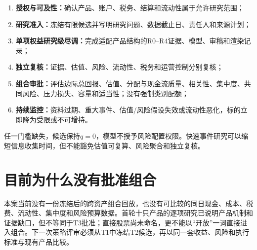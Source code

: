 \begin{enumerate}
  \item \textbf{授权与可及性：}确认产品、账户、税务、结算和流动性属于允许研究范围；
  \item \textbf{研究准入：}冻结有限候选并写明研究问题、数据截止日、责任人和来源计划；
  \item \textbf{单项权益研究级尽调：}完成适配产品结构的R0--R4证据、模型、审稿和渲染记录；
  \item \textbf{独立复核：}证据、估值、风险、流动性、税务和运营控制分别复核；
  \item \textbf{组合审批：}评估边际总回报、估值、分配与现金流质量、相关性、集中度、共同风险、压力损失、容量和适当性；没有强制类别配额；
  \item \textbf{持续监控：}资料过期、重大事件、估值/风险假设失效或流动性恶化，标的立即降为受限或不可增持。
\end{enumerate}

任一门槛缺失，候选保持$q=0$，模型不授予风险配置权限。快速事件研究可以缩短信息收集时间，但不能豁免估值可复算、风险聚合和独立复核。

\section{目前为什么没有批准组合}

本案当前没有一份冻结后的跨资产组合回放，也没有可比较的同日现金、成本、税费、流动性、集中度和风险预算数据。首轮十只产品的逐项研究已说明产品机制和证据缺口，但不等同于T3批准；直接股票尚未命名，更不能以“开放”一词直接进入组合。下一次策略评审必须从T1中冻结T2候选，再以同一套收益、风险和执行标准与现有产品比较。
